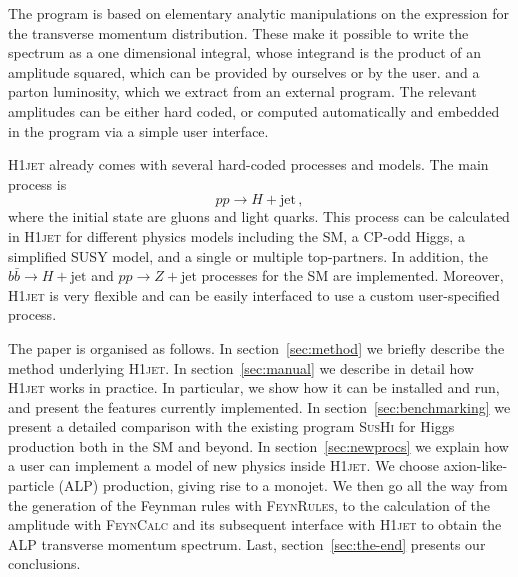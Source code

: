 \documentclass[12pt]{article}
\begin{document}
The program is based on elementary analytic manipulations on the expression
for the transverse momentum distribution. These make it possible to
write the spectrum as a one dimensional integral, whose integrand is
the product of an amplitude squared, which can be provided by ourselves or by the user. and a parton luminosity, which we extract from an external
program. The relevant amplitudes can be
either hard coded, or computed automatically and embedded in the program
via a simple user interface.

\textsc{H1jet} already comes with several hard-coded processes and models. 
The main process is 
\begin{equation}
    pp \to H + \mathrm{jet} \,, 
\end{equation}
where the initial state are gluons and light quarks. This process can be calculated in \textsc{H1jet} for different physics models including the SM, a CP-odd Higgs, a simplified SUSY model, and a single or multiple top-partners. In addition, the $b\bar{b} \to H + \mathrm{jet}$ and $pp \to Z + \mathrm{jet}$ processes for the SM are implemented. Moreover, \textsc{H1jet} is very flexible and can be easily interfaced to use a custom user-specified process. 

The paper is organised as follows. In section~\ref{sec:method} we
briefly describe the method underlying \textsc{H1jet}. In
section~\ref{sec:manual} we describe in detail how \textsc{H1jet}
works in practice. In particular, we show how it can be installed and
run, and present the features currently implemented. In
section~\ref{sec:benchmarking} we present a detailed comparison with
the existing program \textsc{SusHi} for Higgs production both in the
SM and beyond. In section~\ref{sec:newprocs} we explain how a user can
implement a model of new physics inside \textsc{H1jet}. We choose axion-like-particle 
(ALP) production, giving rise to a monojet. We then go all the way from the
generation of the Feynman rules with \textsc{FeynRules}, to the
calculation of the amplitude with \textsc{FeynCalc} and its subsequent
interface with \textsc{H1jet} to obtain the ALP transverse momentum
spectrum. Last, section~\ref{sec:the-end} presents our conclusions.
\end{document}
